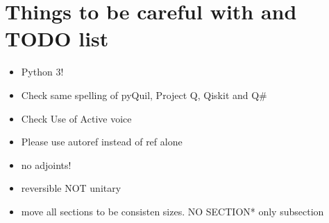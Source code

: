 \section{Things to be careful with and TODO list}

\begin{itemize}
\item Python 3!
\item Check same spelling of pyQuil, Project Q, Qiskit and Q\#
\item Check Use of Active voice
\item Please use autoref instead of ref alone
\item no adjoints!
\item reversible NOT unitary 
\item move all sections to be consisten sizes. NO SECTION*{} only subsection
\end{itemize}
